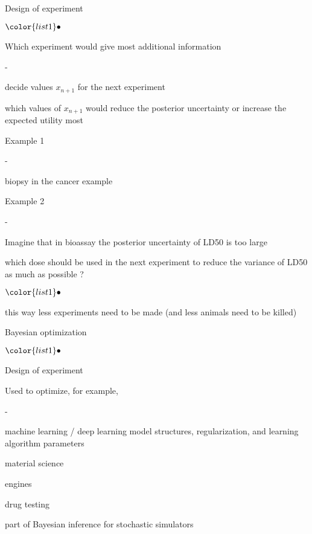 \documentclass[t]{beamer}
\newenvironment{list1}{
   \begin{list}{$\color{list1}\bullet$}{\itemsep=6pt}}{
  \end{list}}
\newenvironment{list2}{
  \begin{list}{-}{\baselineskip=12pt\itemsep=2pt}}{
  \end{list}}
\begin{document}
\begin{frame}
  
  {\Large\color{navyblue} Design of experiment}

  \begin{list1}
  \item Which experiment would give most additional information
    \begin{list2}
    \item decide values $x_{n+1}$ for the next experiment
    \item which values of $x_{n+1}$ would reduce the posterior
      uncertainty or increase the expected utility most
    \end{list2}
  \item<2-> Example 1
    \begin{list2}
      \item biopsy in the cancer example
    \end{list2}
  \item<3-> Example 2
    \begin{list2}
    \item Imagine that in bioassay the posterior uncertainty of LD50 is too large
    \item which dose should be used in the next experiment to reduce
      the variance of LD50 as much as possible ?
      \begin{list1}
        \item this way less experiments need to be made (and less animals need to be killed)
      \end{list1}
    \end{list2}
  \end{list1}
\end{frame}

\begin{frame}
  
  {\Large\color{navyblue} Bayesian optimization}

  \begin{list1}
  \item Design of experiment
  \item Used to optimize, for example,
    \begin{list2}
    \item machine learning / deep learning model structures,
      regularization, and learning algorithm parameters
    \item material science
    \item engines
    \item drug testing
    \item part of Bayesian inference for stochastic simulators
    \end{list2}
  \end{list1}

\end{frame}
\end{document}
